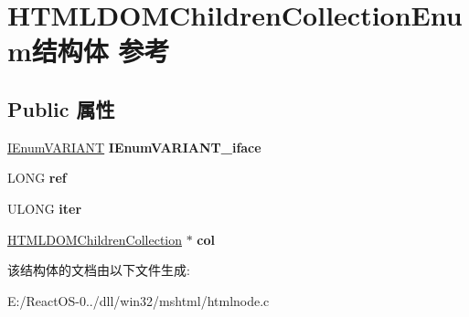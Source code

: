 \hypertarget{struct_h_t_m_l_d_o_m_children_collection_enum}{}\section{H\+T\+M\+L\+D\+O\+M\+Children\+Collection\+Enum结构体 参考}
\label{struct_h_t_m_l_d_o_m_children_collection_enum}
\subsection*{Public 属性}
\begin{DoxyCompactItemize}
\item 
\mbox{\label{struct_h_t_m_l_d_o_m_children_collection_enum_a2e0fe42874bacae0c9ae0826ef091d56}} 
\hyperlink{interface_i_enum_v_a_r_i_a_n_t}{I\+Enum\+V\+A\+R\+I\+A\+NT} {\bfseries I\+Enum\+V\+A\+R\+I\+A\+N\+T\+\_\+iface}
\item 
\mbox{\label{struct_h_t_m_l_d_o_m_children_collection_enum_a81f4dcfa4188dbc609234822ee26877e}} 
L\+O\+NG {\bfseries ref}
\item 
\mbox{\label{struct_h_t_m_l_d_o_m_children_collection_enum_ab7585fb743f0b602f2818ce44aa0145a}} 
U\+L\+O\+NG {\bfseries iter}
\item 
\mbox{\label{struct_h_t_m_l_d_o_m_children_collection_enum_aa412e8ff092c9b239659b9045f4bac15}} 
\hyperlink{struct_h_t_m_l_d_o_m_children_collection}{H\+T\+M\+L\+D\+O\+M\+Children\+Collection} $\ast$ {\bfseries col}
\end{DoxyCompactItemize}


该结构体的文档由以下文件生成\+:\begin{DoxyCompactItemize}
\item 
E\+:/\+React\+O\+S-\/0../dll/win32/mshtml/htmlnode.\+c\end{DoxyCompactItemize}
